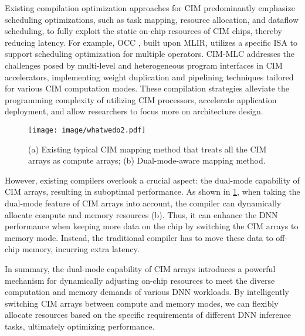 Existing compilation optimization approaches for CIM predominantly emphasize scheduling optimizations, such as task mapping, resource allocation, and dataflow scheduling, to fully exploit the static on-chip resources of CIM chips, thereby reducing latency.
For example, OCC \cite{siemieniuk2021occ}, built upon MLIR, utilizes a specific ISA to support scheduling optimization for multiple operators. 
CIM-MLC \cite{qu2024cim} addresses the challenges posed by multi-level and heterogeneous program interfaces in CIM accelerators, implementing weight duplication and pipelining techniques tailored for various CIM computation modes. These compilation strategies alleviate the programming complexity of utilizing CIM processors, accelerate application deployment, and allow researchers to focus more on architecture design.

\begin{figure}[t]
    \centering
    \texttt{[image: image/whatwedo2.pdf]}
    \caption{(a) Existing typical CIM mapping method that treats all the CIM arrays as compute arrays; (b) Dual-mode-aware mapping method.}
    \label{fig:motivate}
\end{figure}
However, existing compilers overlook a crucial aspect: the dual-mode capability of CIM arrays, resulting in suboptimal performance.
As shown in \fig \ref{fig:motivate}, when taking the dual-mode feature of CIM arrays into account, the compiler can dynamically allocate compute and memory resources (b). Thus, it can enhance the DNN performance when keeping more data on the chip by switching the CIM arrays to memory mode. Instead, the traditional compiler has to move these data to off-chip memory, incurring extra latency.

In summary, the dual-mode capability of CIM arrays introduces a powerful mechanism for dynamically adjusting on-chip resources to meet the diverse computation and memory demands of various DNN workloads. By intelligently switching CIM arrays between compute and memory modes, we can flexibly allocate resources based on the specific requirements of different DNN inference tasks, ultimately optimizing performance.



